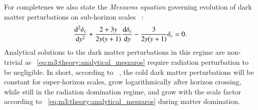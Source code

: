     For completenes we also state the \textit{Meszaros equation} governing evolution of dark matter perturbations on sub-horizon scales ~\cite[Eq. 8.59]{dodelson2020modern}:
    \begin{equation}\label{eq:m3:theory:analytical_meszaros}
        \dv[2]{\delta_c}{y} + \frac{2+3y}{2y(y+1)}\dv{\delta_c}{y} - \frac{3}{2y(y+1)}\delta_c = 0.
    \end{equation}
    Analytical solutions to the dark matter perturbations in this regime are non-trivial as ~\cref{eq:m3:theory:analytical_meszaros} require radiation perturbation to be negligible. In short, according to ~\cite{dodelson2020modern}, the cold dark matter perturbations will be constant for super-horizon scales, grow logarithmically after horizon crossing, while still in the radiation domination regime, and grow with the scale factor according to ~\cref{eq:m3:theory:analytical_meszaros} during matter domination. 